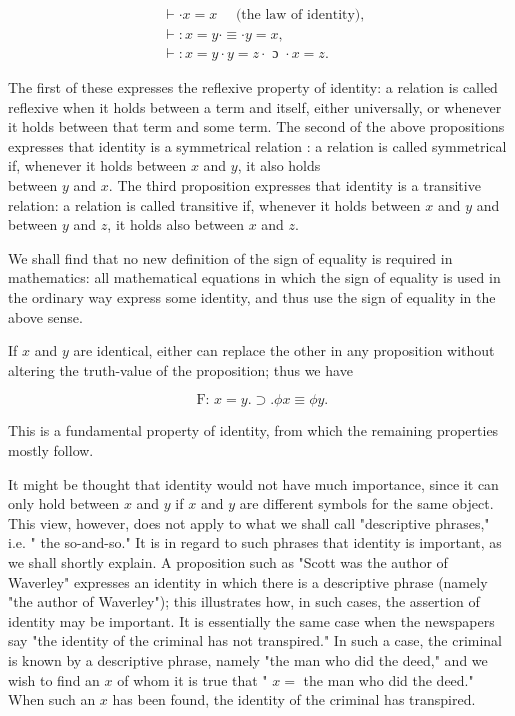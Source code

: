 \documentclass[10pt]{article}
\begin{document}
$$
\begin{aligned}
& \vdash \cdot x=x \quad \text { (the law of identity), } \\
& \vdash: x=y \cdot \equiv \cdot y=x, \\
& \vdash: x=y \cdot y=z \cdot \text { ɔ } \cdot x=z .
\end{aligned}
$$

The first of these expresses the reflexive property of identity: a relation is called reflexive when it holds between a term and itself, either universally, or whenever it holds between that term and some term. The second of the above propositions expresses that identity is a symmetrical relation : a relation is called symmetrical if, whenever it holds between $x$ and $y$, it also holds\\
between $y$ and $x$. The third proposition expresses that identity is a transitive relation: a relation is called transitive if, whenever it holds between $x$ and $y$ and between $y$ and $z$, it holds also between $x$ and $z$.

We shall find that no new definition of the sign of equality is required in mathematics: all mathematical equations in which the sign of equality is used in the ordinary way express some identity, and thus use the sign of equality in the above sense.

If $x$ and $y$ are identical, either can replace the other in any proposition without altering the truth-value of the proposition; thus we have

$$
\text { F: } x=y . \supset . \phi x \equiv \phi y .
$$

This is a fundamental property of identity, from which the remaining properties mostly follow.

It might be thought that identity would not have much importance, since it can only hold between $x$ and $y$ if $x$ and $y$ are different symbols for the same object. This view, however, does not apply to what we shall call "descriptive phrases," i.e. " the so-and-so." It is in regard to such phrases that identity is important, as we shall shortly explain. A proposition such as "Scott was the author of Waverley" expresses an identity in which there is a descriptive phrase (namely "the author of Waverley"); this illustrates how, in such cases, the assertion of identity may be important. It is essentially the same case when the newspapers say "the identity of the criminal has not transpired." In such a case, the criminal is known by a descriptive phrase, namely "the man who did the deed," and we wish to find an $x$ of whom it is true that " $x=$ the man who did the deed." When such an $x$ has been found, the identity of the criminal has transpired.
\end{document}
